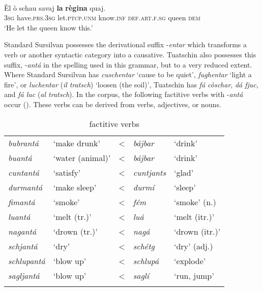 \ea
\label{ex:causscha2}
\\
\gll    Èl ò schau savaj \textbf{la} \textbf{règina} quaj.\\
\textsc{3sg} have.\textsc{prs.3sg} let.\textsc{ptcp.unm} know.\textsc{inf} \textsc{def.art.f.sg} queen \textsc{dem}\\
\glt `He let the queen know this.'
\z

Standard Sursilvan possesses the derivational suffix -\textit{entar} which transforms a verb or another syntactic category into a causative. Tuatschin also possesses this suffix, -\textit{antá} in the spelling used in this grammar, but to a very reduced extent. Where Standard Sursilvan has \textit{cuschentar} `cause to be quiet', \textit{fughentar} `light a fire', or \textit{luchentar} (\textit{il tratsch}) `loosen (the soil)', Tuatschin has \textit{fá còschar}, \textit{dá fjuc}, and \textit{fá luc} (\textit{al tratsch}). In the corpus, the following factitive verbs with -\textit{antá} occur (). These verbs can be derived from verbs, adjectives, or nouns.

\begin{table}
	\caption{factitive verbs}
	\label{factanta}
	\begin{tabular}{lllll}
		\lsptoprule
		\textit{bubrantá} &`make drunk' & < & \textit{bájbar} & `drink'\\
		\textit{buantá} & `water (animal)' & < & \textit{bájbar} & `drink'\\
		\textit{cuntantá} &`satisfy' & < & \textit{cuntjants} & `glad'\\
		\textit{durmantá} & `make sleep' & < & \textit{durmí} & `sleep'\\
		\textit{fimantá} &`smoke' & < & \textit{fém} & `smoke' (n.)\\
		\textit{luantá}	&`melt (tr.)' & < &\textit{luá} & `melt (itr.)'\\
		\textit{nagantá}	&`drown (tr.)' & < & \textit{nagá} & `drown (itr.)'\\
		\textit{schjantá} & `dry' & < & \textit{schétg} & `dry' (adj.)\\
		\textit{schlupantá} & `blow up'&	< & \textit{schlupá} & `explode'\\
		\textit{sagljantá} & `blow up' & < & \textit{saglí} & `run, jump'\\
		
		\lspbottomrule
	\end{tabular}
\end{table}

